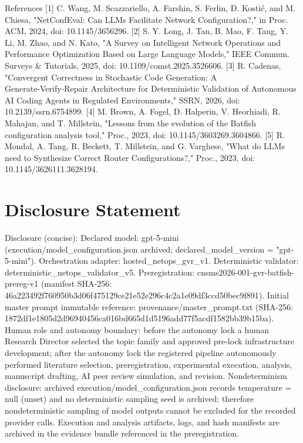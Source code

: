 \documentclass[conference]{IEEEtran}
\begin{document}
References
[1] C. Wang, M. Scazzariello, A. Farshin, S. Ferlin, D. Kostić, and M. Chiesa, "NetConfEval: Can LLMs Facilitate Network Configuration?," in Proc. ACM, 2024, doi: 10.1145/3656296.
[2] S. Y. Long, J. Tan, B. Mao, F. Tang, Y. Li, M. Zhao, and N. Kato, "A Survey on Intelligent Network Operations and Performance Optimization Based on Large Language Models," IEEE Commun. Surveys \& Tutorials, 2025, doi: 10.1109/comst.2025.3526606.
[3] R. Cadenas, "Convergent Correctness in Stochastic Code Generation: A Generate‑Verify‑Repair Architecture for Deterministic Validation of Autonomous AI Coding Agents in Regulated Environments," SSRN, 2026, doi: 10.2139/ssrn.6754899.
[4] M. Brown, A. Fogel, D. Halperin, V. Heorhiadi, R. Mahajan, and T. Millstein, "Lessons from the evolution of the Batfish configuration analysis tool," Proc., 2023, doi: 10.1145/3603269.3604866.
[5] R. Mondal, A. Tang, R. Beckett, T. Millstein, and G. Varghese, "What do LLMs need to Synthesize Correct Router Configurations?," Proc., 2023, doi: 10.1145/3626111.3628194.

\section*{Disclosure Statement}
Disclosure (concise): Declared model: gpt-5-mini (execution/model\_configuration.json archived; declared\_model\_version = "gpt-5-mini"). Orchestration adapter: hosted\_netops\_gvr\_v1. Deterministic validator: deterministic\_netops\_validator\_v5. Preregistration: cnsms2026-001-gvr-batfish-prereg-v1 (manifest SHA‑256: 46a22349\allowbreak{}2f760950\allowbreak{}b3d06f47\allowbreak{}5129ce21\allowbreak{}e52e296c\allowbreak{}4c2a1e09\allowbreak{}df3ccd50\allowbreak{}bec9f891). Initial master prompt immutable reference: provenance/master\_prompt.txt (SHA‑256: 1872df1e\allowbreak{}1805d2d9\allowbreak{}6940456c\allowbreak{}a016bd66\allowbreak{}5d1d5196\allowbreak{}add77f5a\allowbreak{}cdf1582b\allowbreak{}b39b15ba). Human role and autonomy boundary: before the autonomy lock a human Research Director selected the topic family and approved pre‑lock infrastructure development; after the autonomy lock the registered pipeline autonomously performed literature selection, preregistration, experimental execution, analysis, manuscript drafting, AI peer review simulation, and revision. Nondeterminism disclosure: archived execution/model\_configuration.json records temperature = null (unset) and no deterministic sampling seed is archived; therefore nondeterministic sampling of model outputs cannot be excluded for the recorded provider calls. Execution and analysis artifacts, logs, and hash manifests are archived in the evidence bundle referenced in the preregistration.
\end{document}
